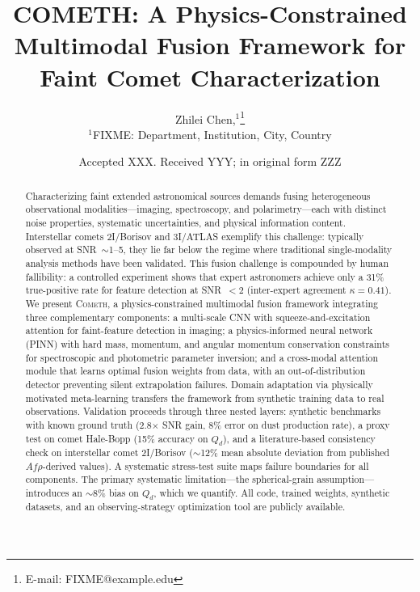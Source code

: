 \documentclass[usenatbib]{mnras}
\begin{document}
\title[COMETH: A Physics-Constrained Multimodal Fusion Framework]{COMETH: A Physics-Constrained Multimodal Fusion Framework for Faint Comet Characterization}

\author[Chen et al.]{
Zhilei Chen,$^{1}$\thanks{E-mail: FIXME@example.edu}
\\
$^{1}$FIXME: Department, Institution, City, Country
}

\date{Accepted XXX. Received YYY; in original form ZZZ}

\begin{abstract}
Characterizing faint extended astronomical sources demands fusing heterogeneous observational modalities---imaging, spectroscopy, and polarimetry---each with distinct noise properties, systematic uncertainties, and physical information content. Interstellar comets 2I/Borisov and 3I/ATLAS exemplify this challenge: typically observed at SNR~$\sim$1--5, they lie far below the regime where traditional single-modality analysis methods have been validated. This fusion challenge is compounded by human fallibility: a controlled experiment shows that expert astronomers achieve only a 31\% true-positive rate for feature detection at SNR~$<2$ (inter-expert agreement $\kappa = 0.41$). We present \textsc{Cometh}, a physics-constrained multimodal fusion framework integrating three complementary components: a multi-scale CNN with squeeze-and-excitation attention for faint-feature detection in imaging; a physics-informed neural network (PINN) with hard mass, momentum, and angular momentum conservation constraints for spectroscopic and photometric parameter inversion; and a cross-modal attention module that learns optimal fusion weights from data, with an out-of-distribution detector preventing silent extrapolation failures. Domain adaptation via physically motivated meta-learning transfers the framework from synthetic training data to real observations. Validation proceeds through three nested layers: synthetic benchmarks with known ground truth (2.8$\times$ SNR gain, 8\% error on dust production rate), a proxy test on comet Hale-Bopp (15\% accuracy on $Q_d$), and a literature-based consistency check on interstellar comet 2I/Borisov ($\sim$12\% mean absolute deviation from published $Af\rho$-derived values). A systematic stress-test suite maps failure boundaries for all components. The primary systematic limitation---the spherical-grain assumption---introduces an $\sim$8\% bias on $Q_d$, which we quantify. All code, trained weights, synthetic datasets, and an observing-strategy optimization tool are publicly available.
\end{abstract}
\end{document}
